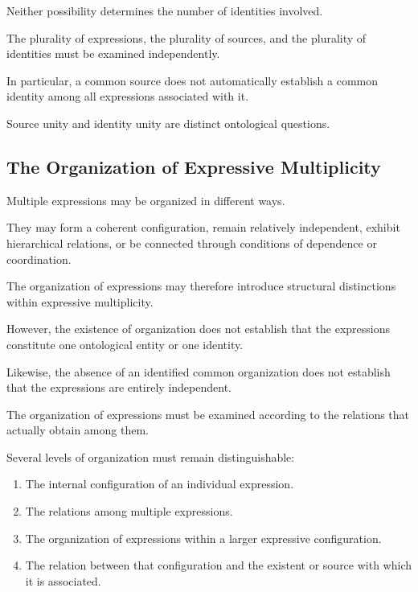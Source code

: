 Neither possibility determines the number
of identities involved.

The plurality of expressions, the plurality
of sources, and the plurality of identities
must be examined independently.

In particular, a common source does not
automatically establish a common identity
among all expressions associated with it.

Source unity and identity unity are distinct
ontological questions.

\subsection{The Organization of Expressive Multiplicity}

Multiple expressions may be organized in
different ways.

They may form a coherent configuration,
remain relatively independent, exhibit
hierarchical relations, or be connected
through conditions of dependence or coordination.

The organization of expressions may therefore
introduce structural distinctions within
expressive multiplicity.

However, the existence of organization does
not establish that the expressions constitute
one ontological entity or one identity.

Likewise, the absence of an identified common
organization does not establish that the
expressions are entirely independent.

The organization of expressions must be
examined according to the relations that
actually obtain among them.

Several levels of organization must remain
distinguishable:

\begin{enumerate}
    \item The internal configuration of an
    individual expression.

    \item The relations among multiple expressions.

    \item The organization of expressions
    within a larger expressive configuration.

    \item The relation between that configuration
    and the existent or source with which
    it is associated.
\end{enumerate}

